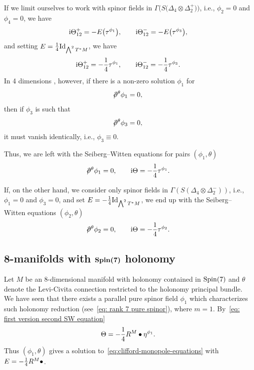 \documentclass[pdftex]{sigma}
\newcommand{\dirac}{/\kern-5pt\partial}
\numberwithin{equation}{section}
\begin{document}
If we limit ourselves to work with spinor fields in $\Gamma\big(S\big(\Delta_4\otimes\Delta_2^+\big)\big)$, i.e., $\phi_2=0$ and $\phi_4=0$, we have
\begin{gather*}
{\rm i}\Theta_{12}^+ = -E\big(\tau^{\phi_1}\big),\qquad
{\rm i}\Theta_{12}^- = -E\big(\tau^{\phi_3}\big),
\end{gather*}
and setting $E={1\over 4}{\rm Id}_{\bigwedge^2T^*M}$, we have
\begin{gather*}
{\rm i}\Theta_{12}^+ = -{1\over 4}\tau^{\phi_1},\qquad
{\rm i}\Theta_{12}^- = -{1\over 4}\tau^{\phi_3}.
\end{gather*}
In 4 dimensions \cite{Morgan}, however, if there is a non-zero solution $\phi_1$ for
\begin{gather*}\dirac^\theta\phi_1=0,\end{gather*}
then if $\phi_3$ is such that
\begin{gather*}\dirac^\theta\phi_3=0,\end{gather*}
it must vanish identically, i.e., $\phi_3\equiv0$.

Thus, we are left with the Seiberg--Witten equations for pairs $(\phi_1,\theta)$~\cite{Friedrich}
\begin{gather*}
\dirac^\theta \phi_1 = 0,\qquad
{\rm i}\Theta = -{1\over 4}\tau^{\phi_1}.
\end{gather*}

If, on the other hand, we consider only spinor fields in $\Gamma(S(\Delta_4\otimes\Delta_2^-))$, i.e., $\phi_1=0$ and $\phi_3=0$, and set $E=-{1\over 4}{\rm Id}_{\bigwedge^2T^*M}$, we end up with the Seiberg--Witten equations $(\phi_2,\theta)$
\begin{gather*}
\dirac^\theta \phi_2 = 0,\qquad
{\rm i}\Theta = -{1\over 4}\tau^{\phi_2}.
\end{gather*}

\subsection[8-manifolds with ${\rm Spin}(7)$ holonomy]{8-manifolds with $\boldsymbol{{\rm Spin}(7)}$ holonomy}

Let $M$ be an $8$-dimensional manifold with holonomy contained in ${\rm Spin}(7)$ and $\theta$ denote the Levi-Civita connection restricted to the holonomy principal bundle. We have seen that there exists a parallel pure spinor field $\phi_1$ which characterizes such holonomy reduction (see~\eqref{eq: rank 7 pure spinor}), where $m=1$. By~\eqref{eq: first version second SW equation}
\begin{gather*}
\Theta = -{1\over 4}R^M\bullet\eta^{\phi_1}.
\end{gather*}
Thus $(\phi_1,\theta)$ gives a solution to~\eqref{eq:clifford-monopole-equations} with $E=-{1\over 4}R^M\bullet$.
\end{document}

